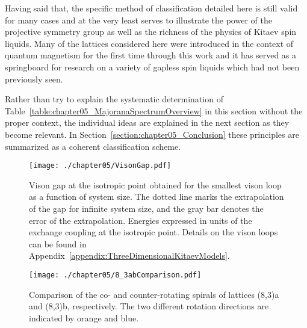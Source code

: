 Having said that, the specific method of classification detailed here is still valid for many cases and at the very least serves to illustrate the power of the projective symmetry group as well as the richness of the physics of Kitaev spin liquids.
Many of the lattices considered here were introduced in the context of quantum magnetism for the first time through this work and it has served as a springboard for research on a variety of gapless spin liquids which had not been previously seen.

Rather than try to explain the systematic determination of Table~\ref{table:chapter05_MajoranaSpectrumOverview} in this section without the proper context, the individual ideas are explained in the next section as they become relevant.
In Section~\ref{section:chapter05_Conclusion} these principles are summarized as a coherent classification scheme.

%
\begin{figure}[p]
	\centering
	\texttt{[image: ./chapter05/VisonGap.pdf]}
	\caption{
		Vison gap at the isotropic point obtained for the smallest vison loop as a function of system size.
		The dotted line marks the extrapolation of the gap for infinite system size, and the gray bar denotes the error of the extrapolation.
		Energies expressed in units of the exchange coupling at the isotropic point.
		Details on the vison loops can be found in Appendix~\ref{appendix:ThreeDimensionalKitaevModels}.
	}
	\label{fig:chapter05_VisonGaps}
		
	\vspace{0.5cm}

	\texttt{[image: ./chapter05/8\_3abComparison.pdf]}
	\caption{
	Comparison of the co- and counter-rotating spirals of lattices (8,3)a and (8,3)b, respectively.
	The two different rotation directions are indicated by orange and blue.
	}
	\label{fig:chapter05_8_3abComparison}
\end{figure}
%

%
%
%
%

